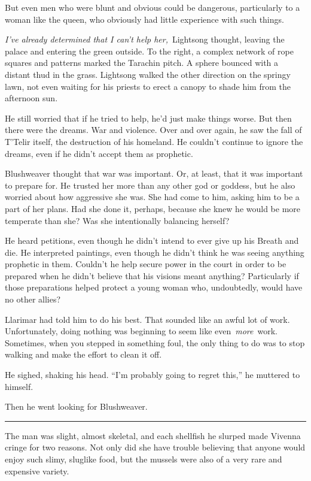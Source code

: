 But even men who were blunt and obvious could be dangerous, particularly to a woman like the queen, who obviously had little experience with such things.

\textit{I’ve already determined that I can’t help her,}~Lightsong thought, leaving the palace and entering the green outside. To the right, a complex network of rope squares and patterns marked the Tarachin pitch. A sphere bounced with a distant thud in the grass. Lightsong walked the other direction on the springy lawn, not even waiting for his priests to erect a canopy to shade him from the afternoon sun.

He still worried that if he tried to help, he’d just make things worse. But then there were the dreams. War and violence. Over and over again, he saw the fall of T’Telir itself, the destruction of his homeland. He couldn’t continue to ignore the dreams, even if he didn’t accept them as prophetic.

Blushweaver thought that war was important. Or, at least, that it was important to prepare for. He trusted her more than any other god or goddess, but he also worried about how aggressive she was. She had come to him, asking him to be a part of her plans. Had she done it, perhaps, because she knew he would be more temperate than she? Was she intentionally balancing herself?

He heard petitions, even though he didn’t intend to ever give up his Breath and die. He interpreted paintings, even though he didn’t think he was seeing anything prophetic in them. Couldn’t he help secure power in the court in order to be prepared when he didn’t believe that his visions meant anything? Particularly if those preparations helped protect a young woman who, undoubtedly, would have no other allies?

Llarimar had told him to do his best. That sounded like an awful lot of work. Unfortunately, doing nothing was beginning to seem like even~\textit{more}~work. Sometimes, when you stepped in something foul, the only thing to do was to stop walking and make the effort to clean it off.

He sighed, shaking his head. “I’m probably going to regret this,” he muttered to himself.

Then he went looking for Blushweaver.

\bigskip \hrule \bigskip

The man was slight, almost skeletal, and each shellfish he slurped made Vivenna cringe for two reasons. Not only did she have trouble believing that anyone would enjoy such slimy, sluglike food, but the mussels were also of a very rare and expensive variety.

